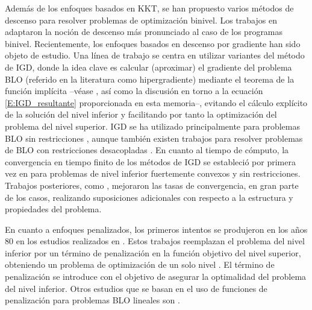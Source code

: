 Además de los enfoques basados en KKT, se han propuesto varios métodos de descenso para resolver problemas de optimización binivel. Los trabajos en \cite{kolstad1990derivative,savard1990steepest} adaptaron la noción de descenso más pronunciado al caso de los programas binivel. Recientemente, los enfoques basados en descenso por gradiente han sido objeto de estudio. Una línea de trabajo se centra en utilizar variantes del método de IGD, donde la idea clave es calcular (aproximar) el gradiente del problema BLO (referido en la literatura como hipergradiente) mediante el teorema de la función implícita --véase \cite{pedregosa2016hyperparameter}, así como la discusión en torno a la ecuación \eqref{E:IGD_resultante} proporcionada en esta memoria--, evitando el cálculo explícito de la solución del nivel inferior y facilitando por tanto la optimización del problema del nivel superior.
IGD se ha utilizado principalmente para problemas BLO sin restricciones \cite{hong2022twotimescale,ghadimi2018approximation,ji2020provably,chen2022single,chen2021closing}, aunque también existen trabajos para resolver problemas de BLO con restricciones desacopladas \cite{khanduri2023linearly,kwon2023penalty,shen2023penaltybased}. %
En cuanto al tiempo de cómputo, la convergencia en tiempo finito de los métodos de IGD se estableció por primera vez en \cite{ghadimi2018approximation} para problemas de nivel inferior fuertemente convexos y sin restricciones. Trabajos posteriores, como \cite{ji2020provably,chen2022single,chen2021closing,hong2020ac,khanduri2021near,shen2022single,Li2022fully,sow2022convergence,yang2023accelerating,ji2021bilevel}, mejoraron las tasas de convergencia, en gran parte de los casos, realizando suposiciones adicionales con respecto a la estructura y propiedades del problema.


En cuanto a enfoques penalizados, los primeros intentos se produjeron en los años 80 en los estudios realizados en \cite{aiyoshi1981hierarchical,aiyoshi1984solution}. Estos trabajos reemplazan el problema del nivel inferior por un término de penalización en la función objetivo del nivel superior, obteniendo un problema de optimización de un solo nivel \cite{ye1997exact,liu2021value,mehra2021penalty,liu2022bome,kwon2023fully}. El término de penalización se introduce con el objetivo de asegurar la optimalidad del problema del nivel inferior. Otros estudios que se basan en el uso de funciones de penalización para problemas BLO lineales son \cite{xu2012nonlinear,maldonado2016analyzing,shen2023penaltybased,gao2022value,lu2024slm}.


